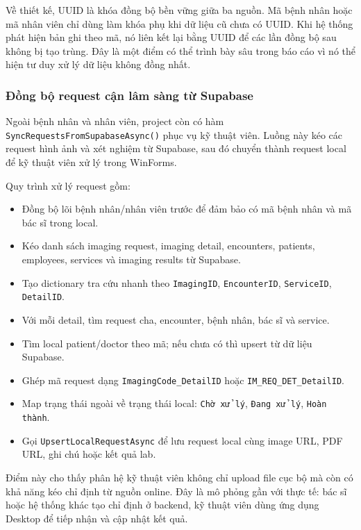\documentclass[12pt,a4paper]{article}
\numberwithin{figure}{subsection}
\numberwithin{table}{subsection}
\begin{document}
Về thiết kế, UUID là khóa đồng bộ bền vững giữa ba nguồn. Mã bệnh nhân hoặc mã nhân viên chỉ dùng làm khóa phụ khi dữ liệu cũ chưa có UUID. Khi hệ thống phát hiện bản ghi theo mã, nó liên kết lại bằng UUID để các lần đồng bộ sau không bị tạo trùng. Đây là một điểm có thể trình bày sâu trong báo cáo vì nó thể hiện tư duy xử lý dữ liệu không đồng nhất.

\subsubsection{Đồng bộ request cận lâm sàng từ Supabase}

Ngoài bệnh nhân và nhân viên, project còn có hàm \texttt{SyncRequestsFromSupabaseAsync()} phục vụ kỹ thuật viên. Luồng này kéo các request hình ảnh và xét nghiệm từ Supabase, sau đó chuyển thành request local để kỹ thuật viên xử lý trong WinForms.

Quy trình xử lý request gồm:

\begin{itemize}
    \item Đồng bộ lõi bệnh nhân/nhân viên trước để đảm bảo có mã bệnh nhân và mã bác sĩ trong local.
    \item Kéo danh sách imaging request, imaging detail, encounters, patients, employees, services và imaging results từ Supabase.
    \item Tạo dictionary tra cứu nhanh theo \texttt{ImagingID}, \texttt{EncounterID}, \texttt{ServiceID}, \texttt{DetailID}.
    \item Với mỗi detail, tìm request cha, encounter, bệnh nhân, bác sĩ và service.
    \item Tìm local patient/doctor theo mã; nếu chưa có thì upsert từ dữ liệu Supabase.
    \item Ghép mã request dạng \texttt{ImagingCode\_DetailID} hoặc \texttt{IM\_REQ\_DET\_DetailID}.
    \item Map trạng thái ngoài về trạng thái local: \texttt{Chờ xử lý}, \texttt{Đang xử lý}, \texttt{Hoàn thành}.
    \item Gọi \texttt{UpsertLocalRequestAsync} để lưu request local cùng image URL, PDF URL, ghi chú hoặc kết quả lab.
\end{itemize}

Điểm này cho thấy phân hệ kỹ thuật viên không chỉ upload file cục bộ mà còn có khả năng kéo chỉ định từ nguồn online. Đây là mô phỏng gần với thực tế: bác sĩ hoặc hệ thống khác tạo chỉ định ở backend, kỹ thuật viên dùng ứng dụng Desktop để tiếp nhận và cập nhật kết quả.
\end{document}
